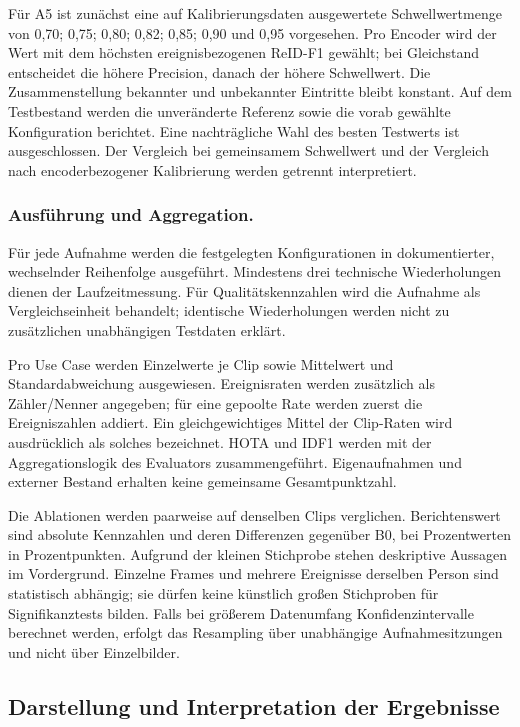 \documentclass[runningheads]{llncs}
\begin{document}
Für A5 ist zunächst eine auf Kalibrierungsdaten ausgewertete Schwellwertmenge von 0,70; 0,75; 0,80; 0,82; 0,85; 0,90 und 0,95 vorgesehen. Pro Encoder wird der Wert mit dem höchsten ereignisbezogenen ReID-F1 gewählt; bei Gleichstand entscheidet die höhere Precision, danach der höhere Schwellwert. Die Zusammenstellung bekannter und unbekannter Eintritte bleibt konstant. Auf dem Testbestand werden die unveränderte Referenz sowie die vorab gewählte Konfiguration berichtet. Eine nachträgliche Wahl des besten Testwerts ist ausgeschlossen. Der Vergleich bei gemeinsamem Schwellwert und der Vergleich nach encoderbezogener Kalibrierung werden getrennt interpretiert.

\subsubsection{Ausführung und Aggregation.}
Für jede Aufnahme werden die festgelegten Konfigurationen in dokumentierter, wechselnder Reihenfolge ausgeführt. Mindestens drei technische Wiederholungen dienen der Laufzeitmessung. Für Qualitätskennzahlen wird die Aufnahme als Vergleichseinheit behandelt; identische Wiederholungen werden nicht zu zusätzlichen unabhängigen Testdaten erklärt.

Pro Use Case werden Einzelwerte je Clip sowie Mittelwert und Standardabweichung ausgewiesen. Ereignisraten werden zusätzlich als Zähler/Nenner angegeben; für eine gepoolte Rate werden zuerst die Ereigniszahlen addiert. Ein gleichgewichtiges Mittel der Clip-Raten wird ausdrücklich als solches bezeichnet. HOTA und IDF1 werden mit der Aggregationslogik des Evaluators zusammengeführt. Eigenaufnahmen und externer Bestand erhalten keine gemeinsame Gesamtpunktzahl.

Die Ablationen werden paarweise auf denselben Clips verglichen. Berichtenswert sind absolute Kennzahlen und deren Differenzen gegenüber B0, bei Prozentwerten in Prozentpunkten. Aufgrund der kleinen Stichprobe stehen deskriptive Aussagen im Vordergrund. Einzelne Frames und mehrere Ereignisse derselben Person sind statistisch abhängig; sie dürfen keine künstlich großen Stichproben für Signifikanztests bilden. Falls bei größerem Datenumfang Konfidenzintervalle berechnet werden, erfolgt das Resampling über unabhängige Aufnahmesitzungen und nicht über Einzelbilder.

\subsection{Darstellung und Interpretation der Ergebnisse}
\end{document}
